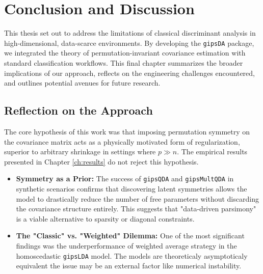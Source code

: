 \documentclass[a4paper,11pt,twoside]{report}
\theoremstyle{definition}
\begin{document}

\chapter{Conclusion and Discussion}
\label{ch:conclusion}
This thesis set out to address the limitations of classical discriminant analysis in high-dimensional, data-scarce environments. By developing the \texttt{gipsDA} package, we  integrated the theory of permutation-invariant covariance estimation with standard classification workflows. This final chapter summarizes the broader implications of our approach, reflects on the engineering challenges encountered, and outlines potential avenues for future research.

\section{Reflection on the Approach}
\label{sec:reflection}

The core hypothesis of this work was that imposing permutation symmetry on the covariance matrix acts as a physically motivated form of regularization, superior to arbitrary shrinkage in settings where $p \gg n$. The empirical results presented in Chapter \ref{ch:results} do not reject this hypothesis.

\begin{itemize}
    \item \textbf{Symmetry as a Prior:} The success of \texttt{gipsQDA} and \texttt{gipsMultQDA} in synthetic scenarios confirms that discovering latent symmetries allows the model to drastically reduce the number of free parameters without discarding the covariance structure entirely. This suggests that "data-driven parsimony" is a viable alternative to sparsity or diagonal constraints.
    \item \textbf{The "Classic" vs. "Weighted" Dilemma:} One of the most significant findings was the underperformance of weighted average strategy in the homoscedastic \texttt{gipsLDA} model. The models are theoreticaly asymptoticaly equivalent the issue may be an external factor like numerical instability.
\end{itemize}
\end{document}
